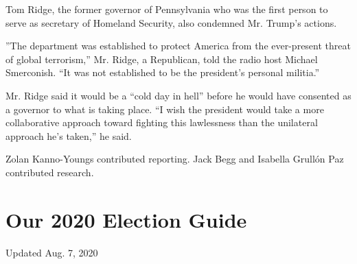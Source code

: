 Tom Ridge, the former governor of Pennsylvania who was the first person
to serve as secretary of Homeland Security, also condemned Mr. Trump's
actions.

''The department was established to protect America from the
ever-present threat of global terrorism,'' Mr. Ridge, a Republican, told
the radio host Michael Smerconish. ``It was not established to be the
president's personal militia.''

Mr. Ridge said it would be a ``cold day in hell'' before he would have
consented as a governor to what is taking place. ``I wish the president
would take a more collaborative approach toward fighting this
lawlessness than the unilateral approach he's taken,'' he said.

Zolan Kanno-Youngs contributed reporting. Jack Begg and Isabella Grullón
Paz contributed research.

\hypertarget{our-2020-election-guide}{%
\section{Our 2020 Election Guide}\label{our-2020-election-guide}}

Updated Aug. 7, 2020

